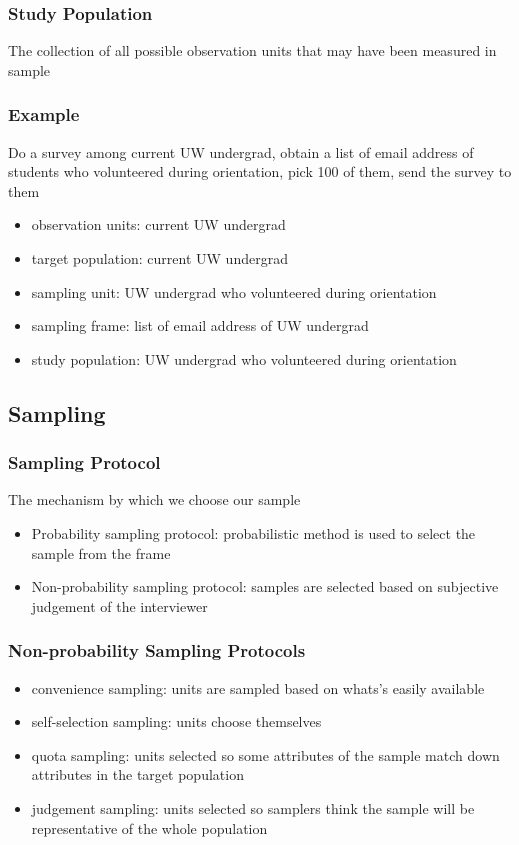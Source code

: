 \documentclass[11pt]{article}
\begin{document}
\subsubsection{Study Population}
The collection of all possible observation units that may have been measured in sample 
\subsubsection*{Example}
Do a survey among current UW undergrad, obtain a list of email address of students who volunteered during orientation, pick 100 of them, send the survey to them 
\begin{itemize}
    \item observation units: current UW undergrad
    \item target population: current UW undergrad 
    \item sampling unit: UW undergrad who volunteered during orientation 
    \item sampling frame: list of email address of UW undergrad 
    \item study population: UW undergrad who volunteered during orientation 
\end{itemize}
\subsection{Sampling}
\subsubsection{Sampling Protocol}
The mechanism by which we choose our sample 
\begin{itemize}
    \item Probability sampling protocol: probabilistic method is used to select the sample from the frame 
    \item Non-probability sampling protocol: samples are selected based on subjective judgement of the interviewer
\end{itemize}
\subsubsection{Non-probability Sampling Protocols}
\begin{itemize}
    \item convenience sampling: units are sampled based on whats's easily available 
    \item self-selection sampling: units choose themselves 
    \item quota sampling: units selected so some attributes of the sample match down attributes in the target population 
    \item judgement sampling: units selected so samplers think the sample will be representative of the whole population 
\end{itemize}
\end{document}
